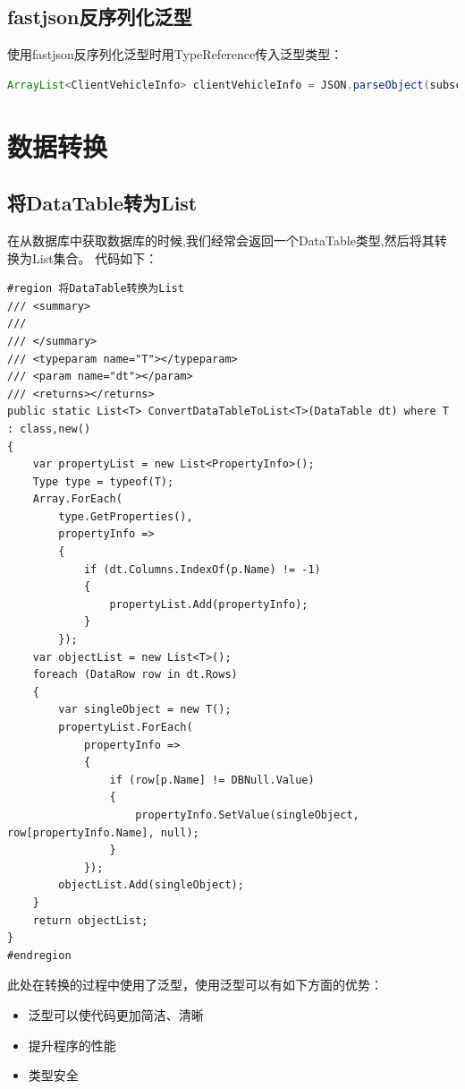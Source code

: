 \documentclass{book}
\begin{document}
\subsection{fastjson反序列化泛型}

使用fastjson反序列化泛型时用TypeReference传入泛型类型：

\begin{lstlisting}[language=Java]
ArrayList<ClientVehicleInfo> clientVehicleInfo = JSON.parseObject(subscribeVehicles, new TypeReference<ArrayList<ClientVehicleInfo>>(){});
\end{lstlisting}

\section{数据转换}

\subsection{将DataTable转为List}

在从数据库中获取数据库的时候,我们经常会返回一个DataTable类型,然后将其转换为List集合。
代码如下：

\begin{lstlisting}[language={[Sharp]C},caption=将DataTable转换为List]
#region 将DataTable转换为List
/// <summary>
/// 
/// </summary>
/// <typeparam name="T"></typeparam>
/// <param name="dt"></param>
/// <returns></returns>
public static List<T> ConvertDataTableToList<T>(DataTable dt) where T : class,new()
{
    var propertyList = new List<PropertyInfo>();
    Type type = typeof(T);
    Array.ForEach(
        type.GetProperties(),
        propertyInfo =>
        {
            if (dt.Columns.IndexOf(p.Name) != -1)
            {
                propertyList.Add(propertyInfo);
            }
        });
    var objectList = new List<T>();
    foreach (DataRow row in dt.Rows)
    {
        var singleObject = new T();
        propertyList.ForEach(
            propertyInfo =>
            {
                if (row[p.Name] != DBNull.Value)
                {
                    propertyInfo.SetValue(singleObject, row[propertyInfo.Name], null);
                }
            });
        objectList.Add(singleObject);
    }
    return objectList;
}
#endregion
\end{lstlisting}

此处在转换的过程中使用了泛型，使用泛型可以有如下方面的优势：

\begin{itemize}
\item{泛型可以使代码更加简洁、清晰}
\item{提升程序的性能}
\item{类型安全}
\end{itemize}
\end{document}
